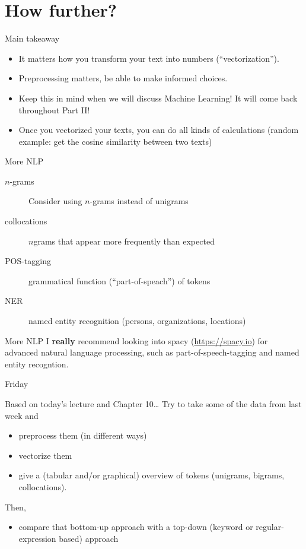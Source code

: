 \documentclass[compress]{beamer}
\begin{document}
\section{How further?}


\begin{frame}{Main takeaway}

\begin{itemize}
	\item It matters how you transform your text into numbers (``vectorization'').
	\item Preprocessing matters, be able to make informed choices.
	\item Keep this in mind when we will discuss Machine Learning! It will come back throughout Part II!
\end{itemize}

\begin{itemize}
	\item Once you vectorized your texts, you can do all kinds of calculations (random example: get the cosine similarity between two texts)
\end{itemize}

\end{frame}


\begin{frame}{More NLP}
\begin{description}
	\item[$n$-grams] Consider using $n$-grams instead of unigrams
	\item[collocations]  $n$grams that appear more frequently than expected
	\item[POS-tagging] grammatical function (``part-of-speach'') of tokens
	\item[NER] named entity recognition (persons, organizations, locations)
\end{description}
\end{frame}

\begin{frame}{More NLP}
I \textbf{really} recommend looking into spacy (\url{https://spacy.io}) for advanced natural language processing, such as part-of-speech-tagging and named entity recogntion.
\end{frame}


\begin{frame}{Friday}
\begin{block}{Based on today's lecture and Chapter 10\ldots}
Try to take some of the data from last week and
\begin{itemize}
	\item preprocess them (in different ways)
	\item vectorize them
	\item give a (tabular and/or graphical) overview of tokens (unigrams, bigrams, collocations).
\end{itemize}
Then,
\begin{itemize}
	\item compare that bottom-up approach with a top-down (keyword or regular-expression based) approach
\end{itemize}

\end{block}
\end{frame}


\end{document}
